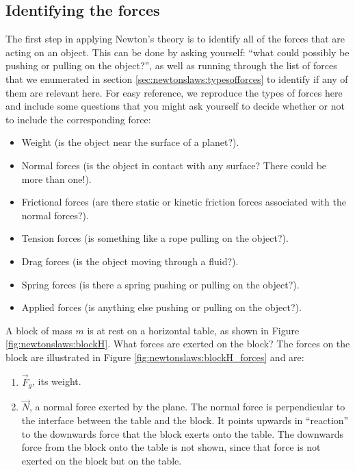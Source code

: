\subsection{Identifying the forces}
The first step in applying Newton's theory is to identify all of the forces that are acting on an object. This can be done by asking yourself: ``what could possibly be pushing or pulling on the object?'', as well as running through the list of forces that we enumerated in section \ref{sec:newtonslaws:typesofforces} to identify if any of them are relevant here. For easy reference, we reproduce the types of forces here and include some questions that you might ask yourself to decide whether or not to include the corresponding force:
\begin{itemize}
\item Weight (is the object near the surface of a planet?).
\item Normal forces (is the object in contact with any surface? There could be more than one!).
\item Frictional forces (are there static or kinetic friction forces associated with the normal forces?).
\item Tension forces (is something like a rope pulling on the object?).
\item Drag forces (is the object moving through a fluid?).
\item Spring forces (is there a spring pushing or pulling on the object?).
\item Applied forces (is anything else pushing or pulling on the object?).
\end{itemize}
\newpage
\begin{example}{
A block of mass $m$ is at rest on a horizontal table, as shown in Figure \ref{fig:newtonslaws:blockH}. What forces are exerted on the block? }
The forces on the block are illustrated in Figure \ref{fig:newtonslaws:blockH_forces} and are:
\begin{enumerate}
\item $\vec F_g$, its weight.
\item $\vec N$, a normal force exerted by the plane. The normal force is perpendicular to the interface between the table and the block. It points upwards in ``reaction'' to the downwards force that the block exerts onto the table. The downwards force from the block onto the table is not shown, since that force is not exerted on the block but on the table.
\end{enumerate}
\end{example}
